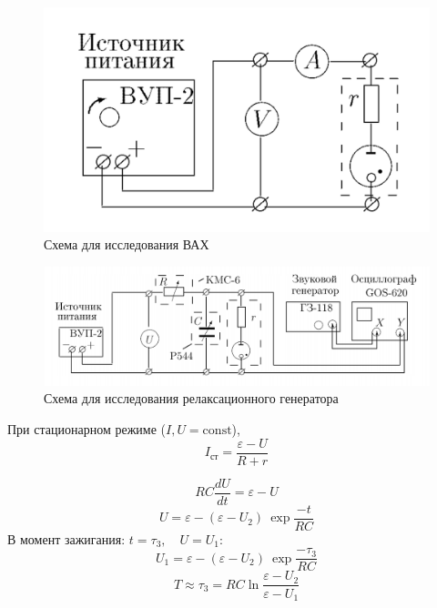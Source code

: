 \documentclass{report}
\begin{document}
\begin{figure}[H]
	\centering
	\includegraphics[width=0.6\linewidth]{Scheme1}
	\caption{Схема для исследования ВАХ}
	\label{fig:s1}
\end{figure}

\begin{figure}[H]
	\centering
	\includegraphics[width=0.8\linewidth]{Scheme2}
	\caption{Схема для исследования релаксационного генератора}
	\label{fig:s2}
\end{figure}

При стационарном режиме ($I, U = \mathrm{const} $),
\begin{equation}\label{k}
	I_{\text{ст}} = \frac{\varepsilon - U}{R + r}
\end{equation}

\begin{equation}\label{key}
	R C \frac{d U}{d t} = \varepsilon - U
\end{equation}
\begin{equation}\label{key}
	U = \varepsilon - (\varepsilon - U_2)\ \exp{\frac{-t}{R C}}
\end{equation}
В момент зажигания: $t = \tau_3,\quad U = U_1$:
\begin{equation}
	U_1 = \varepsilon - (\varepsilon - U_2)\ \exp{\frac{-\tau_3}{R C}}
\end{equation}
\begin{equation}
	T \approx \tau_3 = R C \ln{\frac{\varepsilon - U_2}{\varepsilon - U_1}}
	\label{eq:T}
\end{equation}
\end{document}
